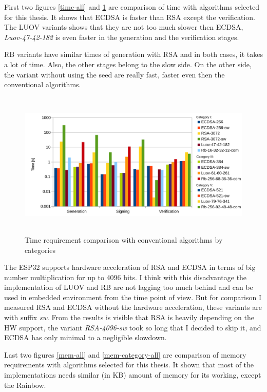 \documentclass[thesis=M,english]{FITthesis}[2019/12/23]
\begin{document}
\noindent
First two figures \ref{time-all} and \ref{time-category-all} are comparison of time with algorithms selected for this thesis. It shows that ECDSA is faster than RSA except the verification. The LUOV variants shows that they are not too much slower then ECDSA, \textit{Luov-47-42-182} is even faster in the generation and the verification stages.

\bigskip
\noindent
RB variants have similar times of generation with RSA and in both cases, it takes a lot of time. Also, the other stages belong to the slow side. On the other side, the variant without using the seed are really fast, faster even then the conventional algorithms.

\begin{figure}[H]
\centering
\includegraphics[width=13cm,height=7cm]{images/time-category-all.pdf}
\caption{Time requirement comparison with conventional algorithms by categories}
\label{time-category-all}
\end{figure}

\bigskip
\noindent
The ESP32 supports hardware acceleration of RSA and ECDSA in terms of big number multiplication for up to 4096 bits. I think with this disadvantage the implementation of LUOV and RB are not lagging too much behind and can be used in embedded environment from the time point of view. But for comparison I measured RSA and ECDSA without the hardware acceleration, these variants are with suffix \textit{sw}. From the results is visible that RSA is heavily depending on the HW support, the variant \textit{RSA-4096-sw} took so long that I decided to skip it, and ECDSA has only minimal to a negligible slowdown.

\bigskip
\noindent
Last two figures \ref{mem-all} and \ref{mem-category-all} are comparison of memory requirements with algorithms selected for this thesis. It shown that most of the implementations needs similar (in KB) amount of memory for its working, except the Rainbow.
\end{document}
